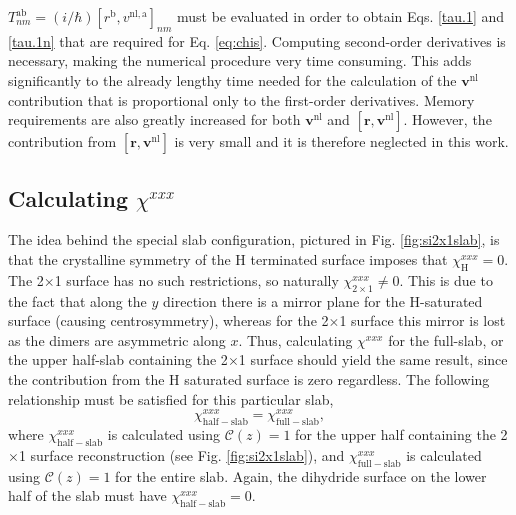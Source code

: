 {\color{red}
$T^{\mathrm{a}\mathrm{b}}_{nm}=(i/\hbar)
[r^\mathrm{b},v^{\mathrm{nl},\mathrm{a}}]_{nm}$ must be evaluated in order to
obtain Eqs. \eqref{tau.1} and \eqref{tau.1n} that are required for Eq.
\eqref{eq:chis}. Computing second-order derivatives is necessary, making the
numerical procedure very time consuming. This adds significantly to the already
lengthy time needed for the calculation of the $\mathbf{v}^\mathrm{nl}$
contribution that is proportional only to the first-order derivatives. Memory
requirements are also greatly increased for both $\mathbf{v}^\mathrm{nl}$ and
$[\mathbf{r},\mathbf{v}^\mathrm{nl}]$. However, the contribution from
$[\mathbf{r},\mathbf{v}^\mathrm{nl}]$ is very small \cite{valerie} and it is
therefore neglected in this work.}



\subsection{Calculating \texorpdfstring{$\chi^{xxx}$}{Xxxx}}
\label{sec:res2x1chi}

The idea behind the special slab configuration, pictured in Fig.
\ref{fig:si2x1slab}, is that the crystalline symmetry of the H terminated
surface imposes that $\chi_{\mathrm{H}}^{xxx}=0$. The 2$\times$1 surface has no
such restrictions, so naturally $\chi_{2\times 1}^{xxx}\ne 0$. This is due to
the fact that along the $y$ direction there is a mirror plane for the
H-saturated surface (causing centrosymmetry), whereas for the 2$\times$1 surface
this mirror is lost as the dimers are asymmetric along $x$. Thus, calculating
$\chi^{xxx}$ for the full-slab, or the upper half-slab containing the 2$\times$1
surface \cite{note1} should yield the same result, since the contribution from
the H saturated surface is zero regardless. The following relationship must be
satisfied for this particular slab,
\begin{equation*}
\chi_{\mathrm{half-slab}}^{xxx} =
\chi_{\mathrm{full-slab}}^{xxx},
\end{equation*}
where $\chi_{\mathrm{half-slab}}^{xxx}$ is calculated using
${\mathbf{\mathcal{C}}}(z) = 1$ for the upper half containing the 2$\times$1
surface reconstruction (see Fig. \ref{fig:si2x1slab}), and
$\chi_{\mathrm{full-slab}}^{xxx}$ is calculated using ${\mathbf{\mathcal{C}}}(z)
= 1$ for the entire slab. Again, the dihydride surface on the lower half of the
slab must have $\chi_{\mathrm{half-slab}}^{xxx} = 0$.

